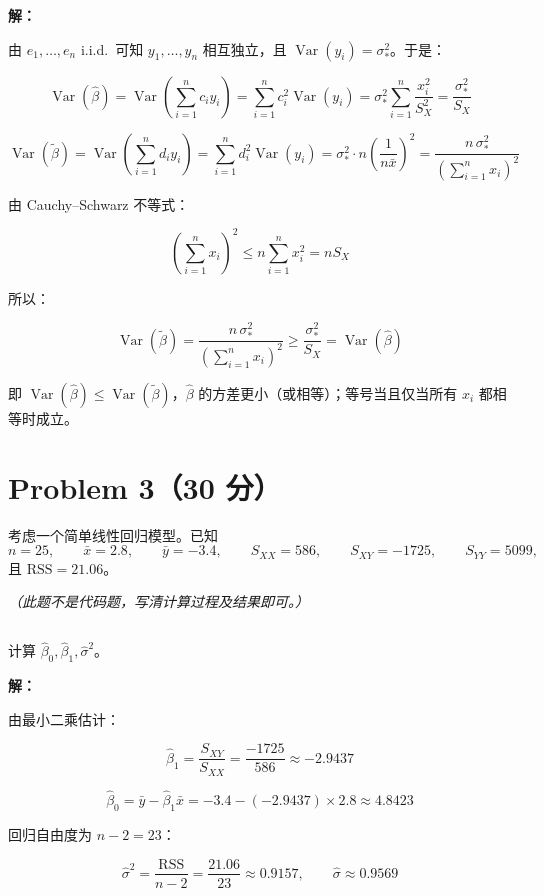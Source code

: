 \documentclass[12pt,a4paper]{article}
\begin{document}
\begin{answerbox}
\textbf{解：}

由 $e_1,\ldots,e_n$ i.i.d.\ 可知 $y_1,\ldots,y_n$ 相互独立，且 $\operatorname{Var}(y_i)=\sigma_*^2$。于是：

$$
\operatorname{Var}\left(\hat{\beta}\right)=\operatorname{Var}\left(\sum_{i=1}^{n}c_iy_i\right)=\sum_{i=1}^{n}c_i^2\operatorname{Var}\left(y_i\right)=\sigma_*^2\sum_{i=1}^{n}\frac{x_i^2}{S_X^2}=\frac{\sigma_*^2}{S_X}
$$

$$
\operatorname{Var}\left(\widetilde{\beta}\right)=\operatorname{Var}\left(\sum_{i=1}^{n}d_iy_i\right)=\sum_{i=1}^{n}d_i^2\operatorname{Var}\left(y_i\right)=\sigma_*^2\cdot n\left(\frac{1}{n\bar{x}}\right)^2=\frac{n\,\sigma_*^2}{\left(\sum_{i=1}^{n}x_i\right)^2}
$$

由 Cauchy--Schwarz 不等式：

$$
\left(\sum_{i=1}^{n}x_i\right)^2\le n\sum_{i=1}^{n}x_i^2=nS_X
$$

所以：

$$
\operatorname{Var}\left(\widetilde{\beta}\right)=\frac{n\,\sigma_*^2}{\left(\sum_{i=1}^{n}x_i\right)^2}\ge\frac{\sigma_*^2}{S_X}=\operatorname{Var}\left(\hat{\beta}\right)
$$

即 $\operatorname{Var}\left(\hat{\beta}\right)\le\operatorname{Var}\left(\widetilde{\beta}\right)$，$\hat{\beta}$ 的方差更小（或相等）；等号当且仅当所有 $x_i$ 都相等时成立。

\end{answerbox}


\section{Problem 3（30 分）}

考虑一个简单线性回归模型。已知
\[
  n=25,\qquad \bar{x}=2.8,\qquad \bar{y}=-3.4,\qquad
  S_{XX}=586,\qquad S_{XY}=-1725,\qquad S_{YY}=5099,
\]
且 $\mathrm{RSS}=21.06$。

\textit{（此题不是代码题，写清计算过程及结果即可。）}

\subsection{}

计算 $\hat{\beta}_0,\hat{\beta}_1,\hat{\sigma}^2$。

\begin{answerbox}
\textbf{解：}

由最小二乘估计：

$$
\hat{\beta}_1=\frac{S_{XY}}{S_{XX}}=\frac{-1725}{586}\approx-2.9437
$$

$$
\hat{\beta}_0=\bar{y}-\hat{\beta}_1\bar{x}=-3.4-(-2.9437)\times 2.8\approx 4.8423
$$

回归自由度为 $n-2=23$：

$$
\hat{\sigma}^2=\frac{\mathrm{RSS}}{n-2}=\frac{21.06}{23}\approx 0.9157,\qquad \hat{\sigma}\approx 0.9569
$$

\end{answerbox}
\end{document}
